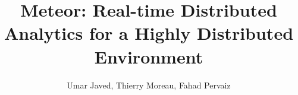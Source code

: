 \documentclass{article}
\begin{document}
\title{Meteor: Real-time Distributed Analytics for a Highly Distributed Environment
}
\author{Umar Javed, Thierry Moreau, Fahad Pervaiz}

\maketitle








\end{document}

